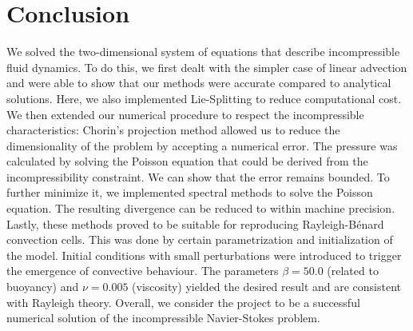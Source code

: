 \chapter{Conclusion}

We solved the two-dimensional system of equations that describe incompressible fluid dynamics.
To do this, we first dealt with the simpler case of linear advection and were able to show that our methods were accurate compared to analytical solutions.
Here, we also implemented Lie-Splitting to reduce computational cost.
We then extended our numerical procedure to respect the incompressible characteristics:
Chorin's projection method allowed us to reduce the dimensionality of the problem by accepting a numerical error.
The pressure was calculated by solving the Poisson equation that could be derived from the incompressibility constraint.
We can show that the error remains bounded. 
To further minimize it, we implemented spectral methods to solve the Poisson equation.
The resulting divergence can be reduced to within machine precision.
Lastly, these methods proved to be suitable for reproducing Rayleigh-B\'{e}nard convection cells.
This was done by certain parametrization and initialization of the model. 
Initial conditions with small perturbations were introduced to trigger the emergence of convective behaviour.
The parameters $\beta= 50.0$ (related to buoyancy) and $\nu = 0.005$ (viscosity) yielded the desired result and are consistent with Rayleigh theory.
Overall, we consider the project to be a successful numerical solution of the incompressible Navier-Stokes problem.


